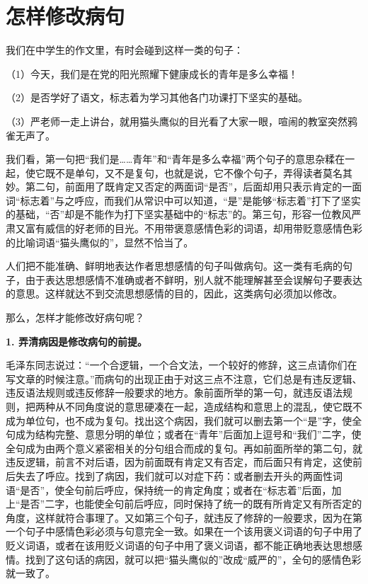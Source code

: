 \section{怎样修改病句}

我们在中学生的作文里，有时会碰到这样一类的句子：

（1）今天，我们是在党的阳光照耀下健康成长的青年是多么幸福！

（2）是否学好了语文，标志着为学习其他各门功课打下坚实的基础。

（3）严老师一走上讲台，就用猫头鹰似的目光看了大家一眼，喧闹的教室突然鸦雀无声了。

我们看，第一句把“我们是……青年”和“青年是多么幸福”两个句子的意思杂糅在一起，使它既不是单句，又不是复句，也就是说，它不像个句子，弄得读者莫名其妙。第二句，前面用了既肯定又否定的两面词“是否”，后面却用只表示肯定的一面词“标志着”与之呼应，而我们从常识中可以知道，“是”是能够“标志着”打下了坚实的基础，“否”却是不能作为打下坚实基础中的“标志”的。第三句，形容一位教风严肃又富有威信的好老师的目光。不用带褒意感情色彩的词语，却用带贬意感情色彩的比喻词语“猫头鹰似的”，显然不恰当了。

人们把不能准确、鲜明地表达作者思想感情的句子叫做病句。这一类有毛病的句子，由于表达思想感情不准确或者不鲜明，别人就不能理解甚至会误解句子要表达的意思。这样就达不到交流思想感情的目的，因此，这类病句必须加以修改。

那么，怎样才能修改好病句呢？

\textbf{1. 弄清病因是修改病句的前提。}

毛泽东同志说过：“一个合逻辑，一个合文法，一个较好的修辞，这三点请你们在写文章的时候注意。”而病句的出现正由于对这三点不注意，它们总是有违反逻辑、违反语法规则或违反修辞一般要求的地方。象前面所举的第一句，就违反语法规则，把两种从不同角度说的意思硬凑在一起，造成结构和意思上的混乱，使它既不成为单位句，也不成为复句。找出这个病因，我们就可以删去第一个“是”字，使全句成为结构完整、意思分明的单位；或者在“青年”后面加上逗号和“我们”二字，使全句成为由两个意义紧密相关的分句组合而成的复句。再如前面所举的第二句，就违反逻辑，前言不对后语，因为前面既有肯定又有否定，而后面只有肯定，这使前后失去了呼应。找到了病因，我们就可以对症下药：或者删去开头的两面性词语“是否”，使全句前后呼应，保持统一的肯定角度；或者在“标志着”后面，加上“是否”二字，也能使全句前后呼应，同时保持了统一的既有所肯定又有所否定的角度，这样就符合事理了。又如第三个句子，就违反了修辞的一般要求，因为在第一个句子中感情色彩必须与句意完全一致。如果在一个该用褒义词语的句子中用了贬义词语，或者在该用贬义词语的句子中用了褒义词语，都不能正确地表达思想感情。找到了这句话的病因，就可以把“猫头鹰似的”改成“威严的”，全句的感情色彩就一致了。

